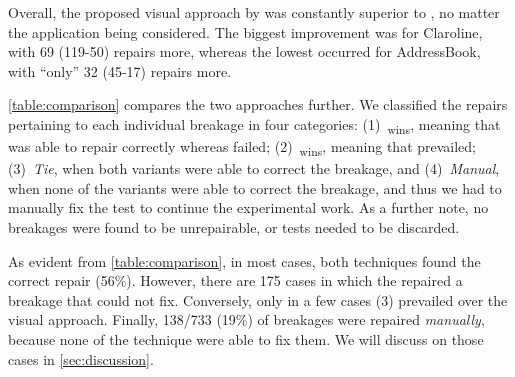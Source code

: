 Overall, the proposed visual approach by \tool was constantly superior to \water, no matter the application being considered. The biggest improvement was for Claroline, with 69 (119-50) repairs more, whereas the lowest occurred for AddressBook, with ``only'' 32 (45-17) repairs more. 

\autoref{table:comparison} compares the two approaches further. We classified the repairs pertaining to each individual breakage in four categories: (1)~\water\textsubscript{wins}, meaning that \water was able to repair correctly whereas \tool failed; (2)~\tool\textsubscript{wins}, meaning that \tool prevailed; (3)~\textit{Tie}, when both variants were able to correct the breakage, and (4)~\textit{Manual}, when none of the variants were able to correct the breakage, and thus we had to manually fix the test to continue the experimental work. As a further note, no breakages were found to be unrepairable, or tests needed to be discarded. 

As evident from \autoref{table:comparison}, in most cases, both techniques found the correct repair (56\%). However, there are 175 cases in which the \tool repaired a breakage that \water could not fix. Conversely, only in a few cases (3) \water prevailed over the visual approach. Finally, 138/733 (19\%) of breakages were repaired \textit{manually}, because none of the technique were able to fix them.
We will discuss on those cases in \autoref{sec:discussion}.


\begin{table}[t]
\setlength{\tabcolsep}{0.9pt}
\renewcommand{\arraystretch}{0.9}
\centering
\caption{Performance results}
\label{table:performance}
\end{table}

